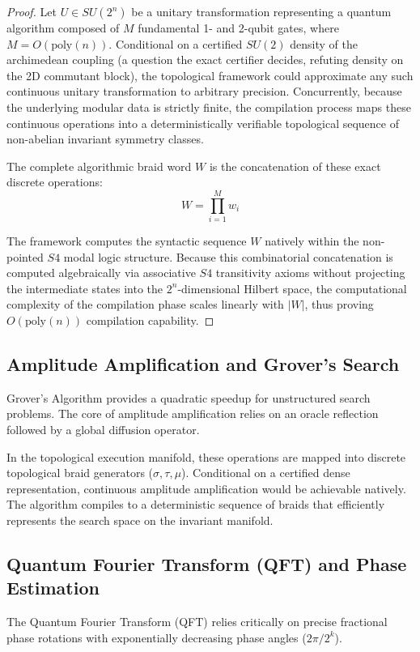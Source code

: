 \begin{proof}
Let $U \in SU(2^n)$ be a unitary transformation representing a quantum algorithm composed of $M$ fundamental 1- and 2-qubit gates, where $M = O(\text{poly}(n))$. 
Conditional on a certified $SU(2)$ density of the archimedean coupling (a question the exact certifier decides, refuting density on the 2D commutant block), the topological framework could approximate any such continuous unitary transformation to arbitrary precision. Concurrently, because the underlying modular data is strictly finite, the compilation process maps these continuous operations into a deterministically verifiable topological sequence of non-abelian invariant symmetry classes.

The complete algorithmic braid word $W$ is the concatenation of these exact discrete operations:
\begin{equation}
W = \prod_{i=1}^M w_i
\end{equation}

The framework computes the syntactic sequence $W$ natively within the non-pointed $S4$ modal logic structure. Because this combinatorial concatenation is computed algebraically via associative $S4$ transitivity axioms without projecting the intermediate states into the $2^n$-dimensional Hilbert space, the computational complexity of the compilation phase scales linearly with $|W|$, thus proving $O(\text{poly}(n))$ compilation capability.
\end{proof}

\subsection{Amplitude Amplification and Grover's Search}
Grover's Algorithm provides a quadratic speedup for unstructured search problems. The core of amplitude amplification relies on an oracle reflection followed by a global diffusion operator.

In the topological execution manifold, these operations are mapped into discrete topological braid generators ($\sigma, \tau, \mu$). Conditional on a certified dense representation, continuous amplitude amplification would be achievable natively. The algorithm compiles to a deterministic sequence of braids that efficiently represents the search space on the invariant manifold.

\subsection{Quantum Fourier Transform (QFT) and Phase Estimation}
The Quantum Fourier Transform (QFT) relies critically on precise fractional phase rotations with exponentially decreasing phase angles ($2\pi/2^k$). 

